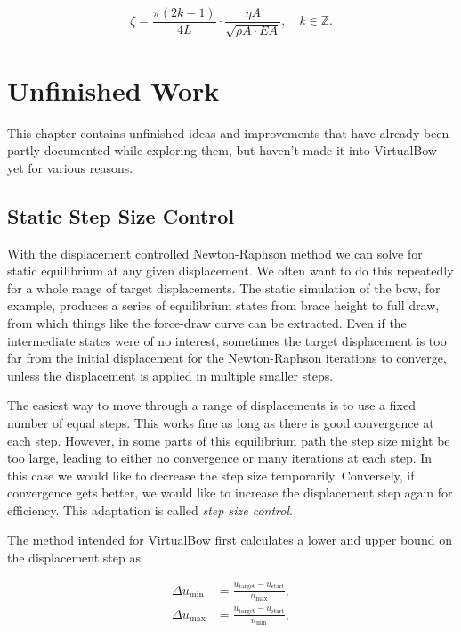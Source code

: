 \begin{equation}
\zeta = \frac{\pi(2k - 1)}{4L}\cdot\frac{\eta A}{\sqrt{\rho A \cdot EA}},\quad k \in \mathbb{Z}.
\end{equation}

\chapter{Unfinished Work}

This chapter contains unfinished ideas and improvements that have already been partly documented while exploring them, but haven't made it into VirtualBow yet for various reasons.

\section{Static Step Size Control}

With the displacement controlled Newton-Raphson method we can solve for static equilibrium at any given displacement.
We often want to do this repeatedly for a whole range of target displacements.
The static simulation of the bow, for example, produces a series of equilibrium states from brace height to full draw, from which things like the force-draw curve can be extracted.
Even if the intermediate states were of no interest, sometimes the target displacement is too far from the initial displacement for the Newton-Raphson iterations to converge, unless the displacement is applied in multiple smaller steps.

The easiest way to move through a range of displacements is to use a fixed number of equal steps.
This works fine as long as there is good convergence at each step.
However, in some parts of this equilibrium path the step size might be too large, leading to either no convergence or many iterations at each step.
In this case we would like to decrease the step size temporarily.
Conversely, if convergence gets better, we would like to increase the displacement step again for efficiency.
This adaptation is called \textit{step size control}.

The method intended for VirtualBow first calculates a lower and upper bound on the displacement step as

\begin{align}
\Delta u_\mathrm{min} &= \frac{u_\mathrm{target} - u_\mathrm{start}}{n_\mathrm{max}}, \\
\Delta u_\mathrm{max} &= \frac{u_\mathrm{target} - u_\mathrm{start}}{n_\mathrm{min}},
\end{align}

